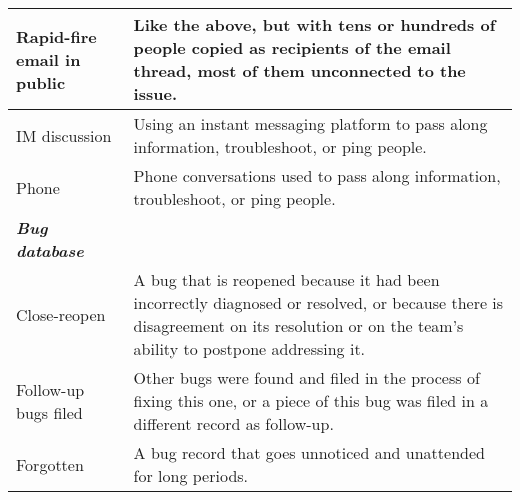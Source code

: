 \begin{table}[tbp]
{\begin{tabular}{p{2.4cm}p{12.2cm}}
\vspace{0.5pt} Rapid-fire email in public & \vspace{0.5pt} Like the above, but with tens or hundreds of people copied as recipients of the email thread, most of them unconnected to the issue. \\
\hline
\vspace{0.5pt} IM discussion & \vspace{0.5pt} Using an instant messaging platform to pass along information, troubleshoot, or ping people. \\
\hline
\vspace{0.5pt} Phone & \vspace{0.5pt} Phone conversations used to pass along information, troubleshoot, or ping people. \\
\hline
\hline
\vspace{1pt} \bfseries \emph{Bug database} & \vspace{1pt} \\
\hline
\vspace{0.5pt} Close-reopen & \vspace{0.5pt} A bug that is reopened because it had been incorrectly diagnosed or resolved, or because there is disagreement on its resolution or on the team's ability to postpone addressing it. \\
\hline
\vspace{0.5pt} Follow-up bugs filed & \vspace{0.5pt} Other bugs were found and filed in the process of fixing this one, or a piece of this bug was filed in a different record as follow-up. \\
\hline
\vspace{0.5pt} Forgotten & \vspace{0.5pt} A bug record that goes unnoticed and unattended for long periods. \\
\hline
\end{tabular}}
\end{table}

